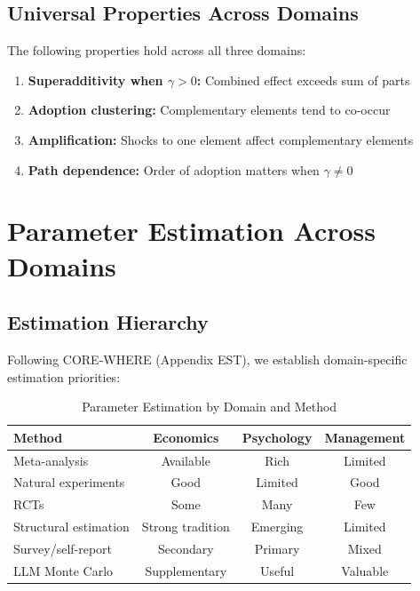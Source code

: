 \subsection{Universal Properties Across Domains}

\begin{theorem}
The following properties hold across all three domains:
\begin{enumerate}
    \item \textbf{Superadditivity when $\gamma > 0$:} Combined effect exceeds sum of parts
    \item \textbf{Adoption clustering:} Complementary elements tend to co-occur
    \item \textbf{Amplification:} Shocks to one element affect complementary elements
    \item \textbf{Path dependence:} Order of adoption matters when $\gamma \neq 0$
\end{enumerate}
\end{theorem}

\section{Parameter Estimation Across Domains}
\label{sec:parameters}

\subsection{Estimation Hierarchy}

Following CORE-WHERE (Appendix EST), we establish domain-specific estimation priorities:

\begin{table}[h]
\centering
\caption{Parameter Estimation by Domain and Method}
\label{tab:estimation}
\renewcommand{\arraystretch}{1.3}
\small
\begin{tabular}{@{}lccc@{}}
\toprule
\textbf{Method} & \textbf{Economics} & \textbf{Psychology} & \textbf{Management} \\
\midrule
Meta-analysis & Available & Rich & Limited \\
Natural experiments & Good & Limited & Good \\
RCTs & Some & Many & Few \\
Structural estimation & Strong tradition & Emerging & Limited \\
Survey/self-report & Secondary & Primary & Mixed \\
LLM Monte Carlo & Supplementary & Useful & Valuable \\
\bottomrule
\end{tabular}
\end{table}


